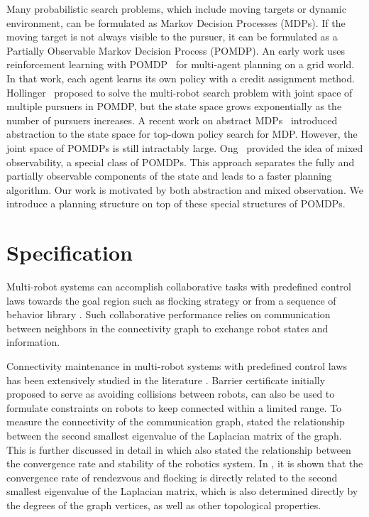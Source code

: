 \documentclass[../main.tex]{subfiles}
\begin{document}
Many probabilistic search problems, which include moving targets or dynamic environment, can be formulated as Markov Decision Processes (MDPs). If the moving target is not always visible to the pursuer, it can be formulated as a Partially Observable Markov Decision Process (POMDP). An early work uses reinforcement learning with POMDP~\cite{arai2000experience} for multi-agent planning on a grid world. In that work, each agent learns its own policy with a credit assignment method. Hollinger~\cite{hollinger2009efficient} proposed to solve the multi-robot search problem with joint space of multiple pursuers in POMDP, but the state space grows exponentially as the number of pursuers increases. A recent work on abstract MDPs~\cite{gopalan2017planning} introduced abstraction to the state space for top-down policy search for MDP. However, the joint space of POMDPs is still intractably large.
Ong~\cite{ong2010planning} provided the idea of mixed observability, a special class of POMDPs. This approach separates the fully and partially observable components of the state and leads to a faster planning algorithm. Our work is motivated by
both abstraction and mixed observation. We introduce a planning structure on top of these special structures of POMDPs.

\section{Specification}
Multi-robot systems can accomplish collaborative tasks with predefined control laws towards the goal region such as flocking strategy \cite{olfati2006flocking,zavlanos2007flocking} or from a sequence of behavior library \cite{nagavalli2017automated}. Such collaborative performance relies on communication between neighbors in the connectivity graph \cite{zavlanos2008distributed} to exchange robot states and information.

Connectivity maintenance in multi-robot systems with predefined control laws has been extensively studied in the literature \cite{michael2009maintaining, zavlanos2008distributed, sabattini2013distributed}. Barrier certificate \cite{borrmann2015control} initially proposed to serve as avoiding collisions between robots, can also be used to formulate constraints on robots to keep connected within a limited range. To measure the connectivity of the communication graph, \cite{fiedler1973algebraic} stated the relationship between the second smallest eigenvalue of the Laplacian matrix of the graph. This is further discussed in detail in \cite{olfati2007consensus} which also stated the relationship between the convergence rate and stability of the robotics system. In \cite{olfati2007consensus, olfati2006flocking}, it is shown that the convergence rate of rendezvous and flocking is directly related to the second smallest eigenvalue of the Laplacian matrix, which is also determined directly by the degrees of the graph vertices, as well as other topological properties. 
\end{document}
